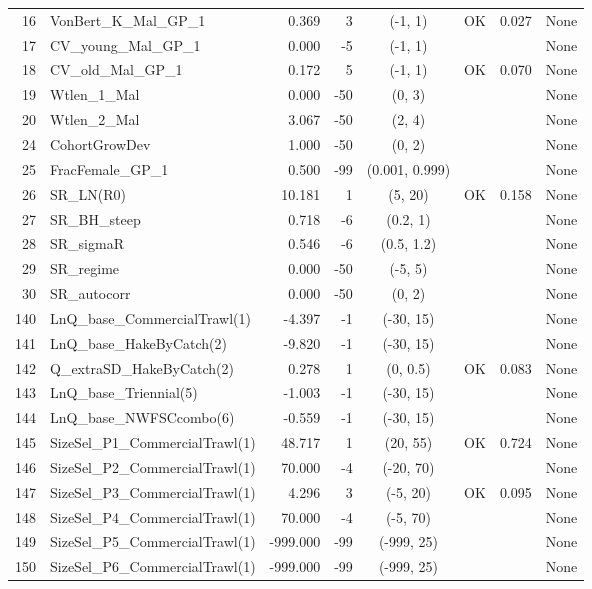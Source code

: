 \documentclass[12pt,]{article}
\begin{document}
\begin{landscape}
\begin{longtable}{rlrrcccl}
  16 & VonBert\_K\_Mal\_GP\_1 & 0.369 & 3 & (-1, 1) & OK & 0.027 & None \\ 
  17 & CV\_young\_Mal\_GP\_1 & 0.000 & -5 & (-1, 1) &  &  & None \\ 
  18 & CV\_old\_Mal\_GP\_1 & 0.172 & 5 & (-1, 1) & OK & 0.070 & None \\ 
  19 & Wtlen\_1\_Mal & 0.000 & -50 & (0, 3) &  &  & None \\ 
  20 & Wtlen\_2\_Mal & 3.067 & -50 & (2, 4) &  &  & None \\ 
  24 & CohortGrowDev & 1.000 & -50 & (0, 2) &  &  & None \\ 
  25 & FracFemale\_GP\_1 & 0.500 & -99 & (0.001, 0.999) &  &  & None \\ 
  26 & SR\_LN(R0) & 10.181 & 1 & (5, 20) & OK & 0.158 & None \\ 
  27 & SR\_BH\_steep & 0.718 & -6 & (0.2, 1) &  &  & None \\ 
  28 & SR\_sigmaR & 0.546 & -6 & (0.5, 1.2) &  &  & None \\ 
  29 & SR\_regime & 0.000 & -50 & (-5, 5) &  &  & None \\ 
  30 & SR\_autocorr & 0.000 & -50 & (0, 2) &  &  & None \\ 
  140 & LnQ\_base\_CommercialTrawl(1) & -4.397 & -1 & (-30, 15) &  &  & None \\ 
  141 & LnQ\_base\_HakeByCatch(2) & -9.820 & -1 & (-30, 15) &  &  & None \\ 
  142 & Q\_extraSD\_HakeByCatch(2) & 0.278 & 1 & (0, 0.5) & OK & 0.083 & None \\ 
  143 & LnQ\_base\_Triennial(5) & -1.003 & -1 & (-30, 15) &  &  & None \\ 
  144 & LnQ\_base\_NWFSCcombo(6) & -0.559 & -1 & (-30, 15) &  &  & None \\ 
  145 & SizeSel\_P1\_CommercialTrawl(1) & 48.717 & 1 & (20, 55) & OK & 0.724 & None \\ 
  146 & SizeSel\_P2\_CommercialTrawl(1) & 70.000 & -4 & (-20, 70) &  &  & None \\ 
  147 & SizeSel\_P3\_CommercialTrawl(1) & 4.296 & 3 & (-5, 20) & OK & 0.095 & None \\ 
  148 & SizeSel\_P4\_CommercialTrawl(1) & 70.000 & -4 & (-5, 70) &  &  & None \\ 
  149 & SizeSel\_P5\_CommercialTrawl(1) & -999.000 & -99 & (-999, 25) &  &  & None \\ 
  150 & SizeSel\_P6\_CommercialTrawl(1) & -999.000 & -99 & (-999, 25) &  &  & None \\ 

\end{longtable}
\end{landscape}
\end{document}
